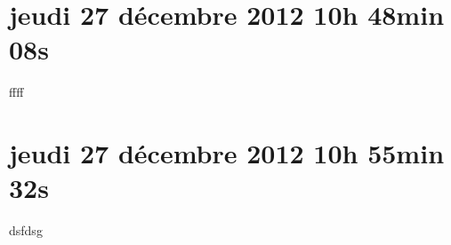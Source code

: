 
\section{jeudi 27 décembre 2012 10h 48min 08s}

ffff

\section{jeudi 27 décembre 2012 10h 55min 32s}

dsfdsg
